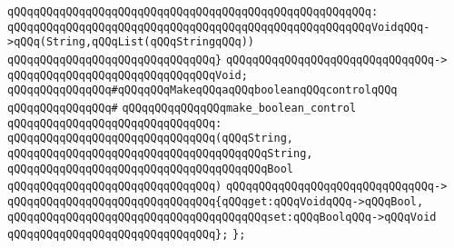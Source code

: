 \verb|qQQqqQQqqQQqqQQqqQQqqQQqqQQqqQQqqQQqqQQqqQQqqQQqqQQqqQQq:|\newline
\verb|qQQqqQQqqQQqqQQqqQQqqQQqqQQqqQQqqQQqqQQqqQQqqQQqqQQqqQQqVoidqQQq->qQQq(String,qQQqList(qQQqStringqQQq))|\newline
\verb|qQQqqQQqqQQqqQQqqQQqqQQqqQQqqQQq}|\newline
\verb|qQQqqQQqqQQqqQQqqQQqqQQqqQQqqQQq->|\newline
\verb|qQQqqQQqqQQqqQQqqQQqqQQqqQQqqQQqVoid;|\newline
\newline
\verb|qQQqqQQqqQQqqQQq#qQQqqQQqMakeqQQqaqQQqbooleanqQQqcontrolqQQq|\newline
\verb|qQQqqQQqqQQqqQQq#|\newline
\verb|qQQqqQQqqQQqqQQqmake_boolean_control|\newline
\verb|qQQqqQQqqQQqqQQqqQQqqQQqqQQqqQQq:|\newline
\verb|qQQqqQQqqQQqqQQqqQQqqQQqqQQqqQQq(qQQqString,|\newline
\verb|qQQqqQQqqQQqqQQqqQQqqQQqqQQqqQQqqQQqqQQqString,|\newline
\verb|qQQqqQQqqQQqqQQqqQQqqQQqqQQqqQQqqQQqqQQqBool|\newline
\verb|qQQqqQQqqQQqqQQqqQQqqQQqqQQqqQQq)|\newline
\verb|qQQqqQQqqQQqqQQqqQQqqQQqqQQqqQQq->|\newline
\verb|qQQqqQQqqQQqqQQqqQQqqQQqqQQqqQQq{qQQqget:qQQqVoidqQQq->qQQqBool,|\newline
\verb|qQQqqQQqqQQqqQQqqQQqqQQqqQQqqQQqqQQqqQQqset:qQQqBoolqQQq->qQQqVoid|\newline
\verb|qQQqqQQqqQQqqQQqqQQqqQQqqQQqqQQq};|\newline
\verb|};|\newline

